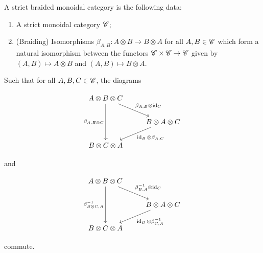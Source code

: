 \begin{definition} A strict braided monoidal category is the following data:

\begin{enumerate}
\item A strict monoidal category $\mathscr{C}$;
\item (Braiding) Isomorphisms $\beta_{A,B}: A\otimes B \xrightarrow{} B\otimes A$ for all $A,B\in \mathscr{C}$ which form a natural isomorphism between the functors $\mathscr{C}\times \mathscr{C}\to \mathscr{C}$ given by $(A,B)\mapsto A\otimes B$ and $(A,B)\mapsto B\otimes A$.
\end{enumerate}

Such that for all $A,B,C\in \mathscr{C}$, the diagrams

\[\begin{tikzcd}
	{A\otimes B\otimes C} \\
	& {B\otimes A\otimes C} \\
	{B\otimes C\otimes A}
	\arrow["{\beta_{A,B}\otimes \id_{C}}", from=1-1, to=2-2]
	\arrow["{\beta_{A,B\otimes C}}"', from=1-1, to=3-1]
	\arrow["{\id_{B}\otimes \beta_{A,C}}", from=2-2, to=3-1]
\end{tikzcd}\]

and

\[\begin{tikzcd}
	{A\otimes B\otimes C} \\
	& {B\otimes A\otimes C} \\
	{B\otimes C\otimes A}
	\arrow["{\beta_{B,A}^{-1}\otimes \id_{C}}", from=1-1, to=2-2]
	\arrow["{\beta^{-1}_{B\otimes C,A}}"', from=1-1, to=3-1]
	\arrow["{\id_{B}\otimes \beta^{-1}_{C,A}}", from=2-2, to=3-1]
\end{tikzcd}\]

commute.

\raggedleft\qedsymbol{}
\end{definition}

